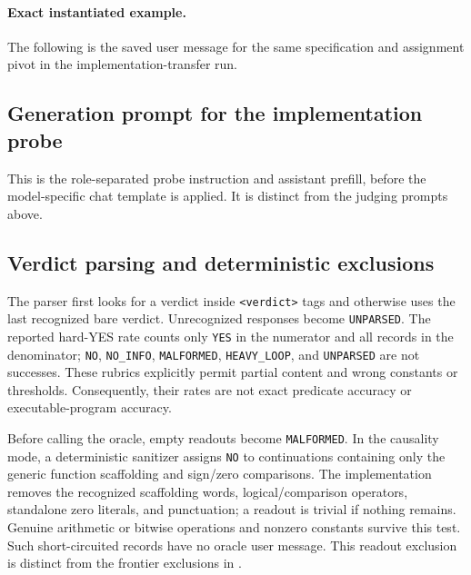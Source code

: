 \paragraph{Exact instantiated example.}
The following is the saved user message for the same specification and assignment pivot in the implementation-transfer run.

\subsection{Generation prompt for the implementation probe}
This is the role-separated probe instruction and assistant prefill, before the model-specific chat template is applied. It is distinct from the judging prompts above.

\subsection{Verdict parsing and deterministic exclusions}
The parser first looks for a verdict inside \texttt{<verdict>} tags and otherwise uses the last recognized bare verdict. Unrecognized responses become \texttt{UNPARSED}. The reported hard-YES rate counts only \texttt{YES} in the numerator and all records in the denominator; \texttt{NO}, \texttt{NO\_INFO}, \texttt{MALFORMED}, \texttt{HEAVY\_LOOP}, and \texttt{UNPARSED} are not successes. These rubrics explicitly permit partial content and wrong constants or thresholds. Consequently, their rates are not exact predicate accuracy or executable-program accuracy.

Before calling the oracle, empty readouts become \texttt{MALFORMED}. In the causality mode, a deterministic sanitizer assigns \texttt{NO} to continuations containing only the generic function scaffolding and sign/zero comparisons. The implementation removes the recognized scaffolding words, logical/comparison operators, standalone zero literals, and punctuation; a readout is trivial if nothing remains. Genuine arithmetic or bitwise operations and nonzero constants survive this test. Such short-circuited records have no oracle user message. This readout exclusion is distinct from the frontier exclusions in .
